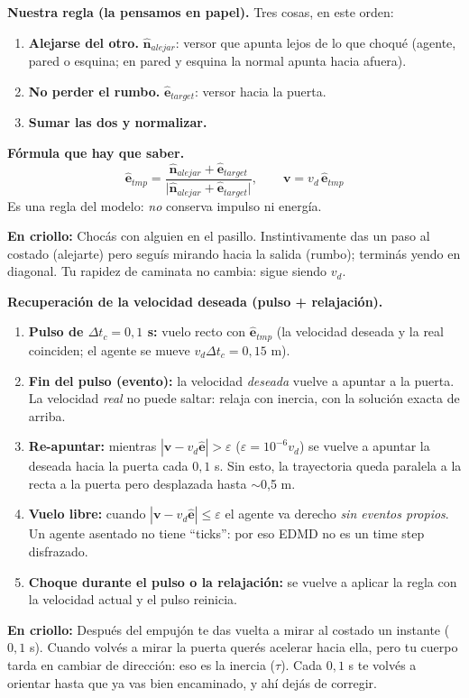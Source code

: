 \documentclass[10.5pt,a4paper]{article}
\newcommand{\vect}[1]{\mathbf{#1}}
\newcommand{\analogia}[1]{\par\colorbox{ana}{\parbox{\dimexpr\linewidth-2\fboxsep}{\textbf{En criollo:} #1}}\par}
\newcommand{\formula}[1]{\par\colorbox{fml}{\parbox{\dimexpr\linewidth-2\fboxsep}{\textbf{Fórmula que hay que saber.} #1}}\par}
\begin{document}
\textbf{Nuestra regla (la pensamos en papel).} Tres cosas, en este orden:
\begin{enumerate}
\item \textbf{Alejarse del otro.} $\hat{\vect n}_{alejar}$: versor que apunta lejos de lo que choqué (agente, pared o esquina; en pared y esquina la normal apunta hacia afuera).
\item \textbf{No perder el rumbo.} $\hat{\vect e}_{target}$: versor hacia la puerta.
\item \textbf{Sumar las dos y normalizar.}
\end{enumerate}
\formula{
\[
\hat{\vect e}_{tmp}=\frac{\hat{\vect n}_{alejar}+\hat{\vect e}_{target}}{\bigl|\hat{\vect n}_{alejar}+\hat{\vect e}_{target}\bigr|},\qquad \vect v=v_d\,\hat{\vect e}_{tmp}
\]
Es una regla del modelo: \emph{no} conserva impulso ni energía.}
\analogia{Chocás con alguien en el pasillo. Instintivamente das un paso al costado (alejarte) pero seguís mirando hacia la salida (rumbo); terminás yendo en diagonal. Tu rapidez de caminata no cambia: sigue siendo $v_d$.}

\textbf{Recuperación de la velocidad deseada (pulso + relajación).}
\begin{enumerate}
\item \textbf{Pulso de $\Delta t_c=0{,}1$ s:} vuelo recto con $\hat{\vect e}_{tmp}$ (la velocidad deseada y la real coinciden; el agente se mueve $v_d\Delta t_c=0{,}15$ m).
\item \textbf{Fin del pulso (evento):} la velocidad \emph{deseada} vuelve a apuntar a la puerta. La velocidad \emph{real} no puede saltar: relaja con inercia, con la solución exacta de arriba.
\item \textbf{Re-apuntar:} mientras $|\vect v-v_d\hat{\vect e}|>\varepsilon$ ($\varepsilon=10^{-6}v_d$) se vuelve a apuntar la deseada hacia la puerta cada $0{,}1$ s. Sin esto, la trayectoria queda paralela a la recta a la puerta pero desplazada hasta $\sim$0,5 m.
\item \textbf{Vuelo libre:} cuando $|\vect v-v_d\hat{\vect e}|\leq\varepsilon$ el agente va derecho \emph{sin eventos propios}. Un agente asentado no tiene ``ticks'': por eso EDMD no es un time step disfrazado.
\item \textbf{Choque durante el pulso o la relajación:} se vuelve a aplicar la regla con la velocidad actual y el pulso reinicia.
\end{enumerate}
\analogia{Después del empujón te das vuelta a mirar al costado un instante ($0{,}1$ s). Cuando volvés a mirar la puerta querés acelerar hacia ella, pero tu cuerpo tarda en cambiar de dirección: eso es la inercia ($\tau$). Cada $0{,}1$ s te volvés a orientar hasta que ya vas bien encaminado, y ahí dejás de corregir.}
\end{document}
